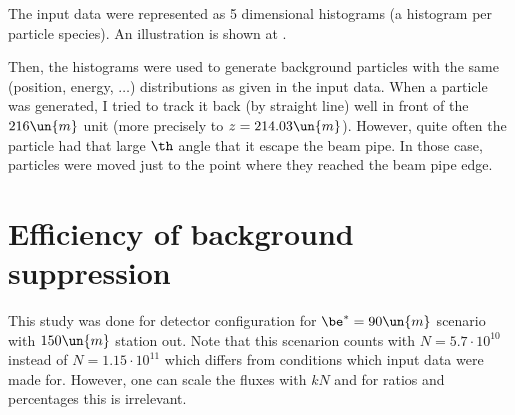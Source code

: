 \iffalse
- table of fluxes (Hz)
--------------------------
   process  rate(Hz)   
--------------------------
        ga   2.4E+05   
  (physics   2.0E+04   for 100mb @ $L = 2E29 cm^-2 s^-1$)
        e-   1.2E+04   
        e+   8.5E+03   
       pi+   9.9E+02   
       pi-   7.4E+02   
         p   4.9E+02   
         n   2.6E+02   
      le n   3.0E+01   
      le p   2.1E+00   
--------------------------
\fi


The input data were represented as 5 dimensional histograms (a histogram per particle species). An illustration is shown at .


Then, the histograms were used to generate background particles with the same (position, energy, $\ldots$) distributions as given in the input data. When a particle was generated, I tried to track it back (by straight line) well in front of the $216\un{m}$ unit (more precisely to $z = 214.03\un{m}$). However, quite often the particle had that large $\th$ angle that it escape the beam pipe. In those case, particles were moved just to the point where they reached the beam pipe edge. 



\section{Efficiency of background suppression}

This study was done for detector configuration for $\be^*=90\un{m}$ scenario with $150\un{m}$ station out. Note that this scenarion counts with $N=5.7\cdot10^{10}$ instead of $N=1.15\cdot10^{11}$ which differs from conditions which input data were made for. However, one can scale the fluxes with $kN$ and for ratios and percentages this is irrelevant.

